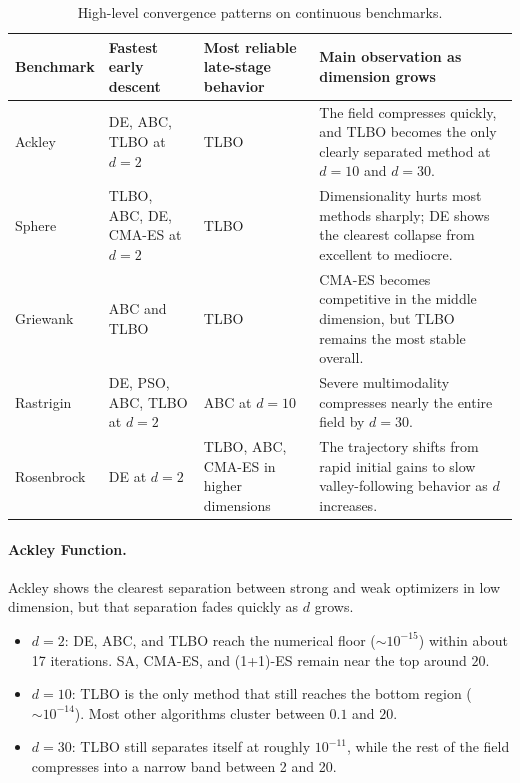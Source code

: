 \begin{table}[H]
    \centering
    \small
    \begin{tabular}{|p{}|p{}|p{}|p{}|}
        \hline
        \textbf{Benchmark} & \textbf{Fastest early descent} & \textbf{Most reliable late-stage behavior} & \textbf{Main observation as dimension grows} \\
        \hline
        Ackley & DE, ABC, TLBO at $d=2$ & TLBO & The field compresses quickly, and TLBO becomes the only clearly separated method at $d=10$ and $d=30$. \\
        \hline
        Sphere & TLBO, ABC, DE, CMA-ES at $d=2$ & TLBO & Dimensionality hurts most methods sharply; DE shows the clearest collapse from excellent to mediocre. \\
        \hline
        Griewank & ABC and TLBO & TLBO & CMA-ES becomes competitive in the middle dimension, but TLBO remains the most stable overall. \\
        \hline
        Rastrigin & DE, PSO, ABC, TLBO at $d=2$ & ABC at $d=10$ & Severe multimodality compresses nearly the entire field by $d=30$. \\
        \hline
        Rosenbrock & DE at $d=2$ & TLBO, ABC, CMA-ES in higher dimensions & The trajectory shifts from rapid initial gains to slow valley-following behavior as $d$ increases. \\
        \hline
    \end{tabular}
    \caption{High-level convergence patterns on continuous benchmarks.}
    \label{tab:conv-cont-summary}
\end{table}

\paragraph{Ackley Function.}
Ackley shows the clearest separation between strong and weak optimizers in low dimension, but that separation fades quickly as $d$ grows.
\begin{itemize}
    \item $d=2$: DE, ABC, and TLBO reach the numerical floor ($\sim 10^{-15}$) within about 17 iterations. SA, CMA-ES, and (1+1)-ES remain near the top around $20$.
    \item $d=10$: TLBO is the only method that still reaches the bottom region ($\sim 10^{-14}$). Most other algorithms cluster between $0.1$ and $20$.
    \item $d=30$: TLBO still separates itself at roughly $10^{-11}$, while the rest of the field compresses into a narrow band between 2 and 20.
\end{itemize}

